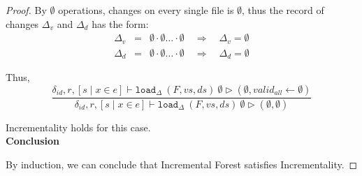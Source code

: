\documentclass[10pt,twoside,a4paper]{article}
\theoremstyle{theorem}
\theoremstyle{lemma}
\theoremstyle{property}
\theoremstyle{definition}
\theoremstyle{assumption}
\begin{document}
\begin{proof}
	By $\emptyset$ operations, changes on every single file is $\emptyset$, thus the record of changes $\Delta_v$ and $\Delta_d$ has the form:
	\begin{eqnarray*}
		\Delta_v &=& \emptyset \cdot \emptyset \dots \cdot \emptyset \quad \Rightarrow \quad \Delta_v = \emptyset\\
		\Delta_d &=& \emptyset \cdot \emptyset \dots \cdot \emptyset \quad \Rightarrow \quad \Delta_d = \emptyset
	\end{eqnarray*}

	Thus,
	\begin{displaymath}
	\frac
	{\delta_{id}, r, [ s \mid x \in e] \vdash \mathtt{load}_\Delta~ (F,vs,ds)~ \emptyset \rhd (\emptyset, valid_{all} \leftarrow \emptyset)}
	{\delta_{id}, r, [ s \mid x \in e] \vdash \mathtt{load}_\Delta~ (F,vs,ds)~ \emptyset \rhd (\emptyset, \emptyset)}
	\end{displaymath}

	Incrementality holds for this case.\\

	\textbf{Conclusion}

	By induction, we can conclude that Incremental Forest satisfies Incrementality.
\end{proof}
\end{document}
